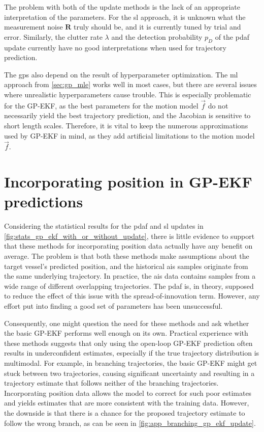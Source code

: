 The problem with both of the update methods is the lack of an appropriate interpretation of the parameters. For the \acrshort{sl} approach, it is unknown what the measurement noise $\boldsymbol{R}$ truly should be, and it is currently tuned by trial and error. Similarly, the clutter rate $\lambda$ and the detection probability $p_D$ of the \acrshort{pdaf} update currently have no good interpretations when used for trajectory prediction. 

The \acrshort{gp}s also depend on the result of hyperparameter optimization. The \acrshort{ml} approach from \cref{sec:gp_mle} works well in most cases, but there are several issues where unrealistic hyperparameters cause trouble. This is especially problematic for the GP-EKF, as the best parameters for the motion model $\vec{f}$ do not necessarily yield the best trajectory prediction, and the Jacobian is sensitive to short length scales. Therefore, it is vital to keep the numerous approximations used by GP-EKF in mind, as they add artificial limitations to the motion model $\vec{f}$.

\section{Incorporating position in GP-EKF predictions}
Considering the statistical results for the \acrshort{pdaf} and \acrshort{sl} updates in \cref{fig:stats_gp_ekf_with_or_without_update}, there is little evidence to support that these methods for incorporating position data actually have any benefit on average. The problem is that both these methods make assumptions about the target vessel's predicted position, and the historical \acrshort{ais} samples originate from the same underlying trajectory. In practice, the \acrshort{ais} data contains samples from a wide range of different overlapping trajectories. The \acrshort{pdaf} is, in theory, supposed to reduce the effect of this issue with the spread-of-innovation term. However, any effort put into finding a good set of parameters has been unsuccessful. 

Consequently, one might question the need for these methods and ask whether the basic GP-EKF performs well enough on its own. Practical experience with these methods suggests that only using the open-loop GP-EKF prediction often results in underconfident estimates, especially if the true trajectory distribution is multimodal. For example, in branching trajectories, the basic GP-EKF might get stuck between two trajectories, causing significant uncertainty and resulting in a trajectory estimate that follows neither of the branching trajectories. Incorporating position data allows the model to correct for such poor estimates and yields estimates that are more consistent with the training data. However, the downside is that there is a chance for the proposed trajectory estimate to follow the wrong branch, as can be seen in \cref{fig:app_branching_gp_ekf_update}.

